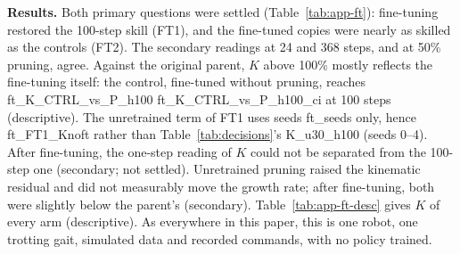 \textbf{Results.} Both primary questions were settled (Table~\ref{tab:app-ft}): fine-tuning restored the 100-step
skill (FT1), and the fine-tuned copies were nearly as skilled as the controls (FT2). The secondary readings at 24 and
368 steps, and at 50\% pruning, agree. Against the original parent, $K$ above 100\% mostly reflects the fine-tuning
itself: the control, fine-tuned without pruning, reaches {{ft_K_CTRL_vs_P_h100}} {{ft_K_CTRL_vs_P_h100_ci}} at 100
steps (descriptive). The unretrained term of FT1 uses seeds {{ft_seeds}} only, hence {{ft_FT1_Knoft}} rather than
Table~\ref{tab:decisions}'s {{K_u30_h100}} (seeds 0--4). After fine-tuning, the one-step reading of $K$ could not be
separated from the 100-step one (secondary; not settled). Unretrained pruning raised the kinematic residual and did
not measurably move the growth rate; after fine-tuning, both were slightly below the parent's (secondary). Table~\ref{tab:app-ft-desc} gives $K$ of every arm (descriptive). As everywhere in this paper, this is
one robot, one trotting gait, simulated data and recorded commands, with no policy trained.

